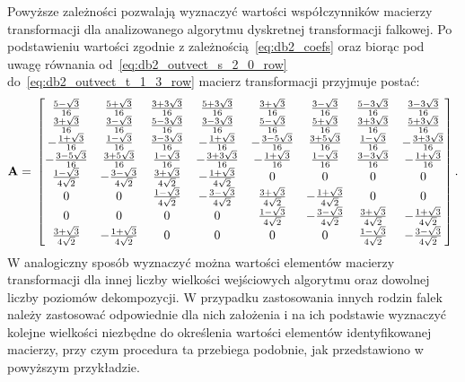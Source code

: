 Powyższe zależności pozwalają wyznaczyć wartości współczynników macierzy transformacji dla analizowanego algorytmu dyskretnej transformacji falkowej. Po podstawieniu wartości zgodnie z zależnością~\eqref{eq:db2_coefs} oraz biorąc pod uwagę równania od~\eqref{eq:db2_outvect_s_2_0_row} do~\eqref{eq:db2_outvect_t_1_3_row} macierz transformacji przyjmuje postać:
\begin{equation}
\mathbf{A} = \\
\begin{bmatrix}
\frac{5 - \sqrt{3}}{16} & \frac{5 + \sqrt{3}}{16} & \frac{3 + 3 \sqrt{3}}{16} & \frac{5 + 3 \sqrt{3}}{16} & \frac{3 + \sqrt{3}}{16} & \frac{3 - \sqrt{3}}{16} & \frac{5 - 3 \sqrt{3}}{16} & \frac{3 - 3 \sqrt{3}}{16} \\
\frac{3 + \sqrt{3}}{16} & \frac{3 - \sqrt{3}}{16} & \frac{5 - 3 \sqrt{3}}{16} & \frac{3 - 3 \sqrt{3}}{16} & \frac{5 - \sqrt{3}}{16} & \frac{5 + \sqrt{3}}{16} & \frac{3 + 3 \sqrt{3}}{16} & \frac{5 + 3 \sqrt{3}}{16} \\
- \frac{1 + \sqrt{3}}{16} & \frac{1 - \sqrt{3}}{16} & \frac{3 - 3 \sqrt{3}}{16} & - \frac{1 + \sqrt{3}}{16} & - \frac{3 - 5 \sqrt{3}}{16} & \frac{3 + 5 \sqrt{3}}{16} & \frac{1 - \sqrt{3}}{16} & - \frac{3 + 3 \sqrt{3}}{16} \\
- \frac{3 - 5 \sqrt{3}}{16} & \frac{3 + 5 \sqrt{3}}{16} & \frac{1 - \sqrt{3}}{16} & - \frac{3 + 3 \sqrt{3}}{16} & - \frac{1 + \sqrt{3}}{16} & \frac{1 - \sqrt{3}}{16} & \frac{3 - 3 \sqrt{3}}{16} & - \frac{1 + \sqrt{3}}{16} \\
\frac{1 - \sqrt{3}}{4 \sqrt{2}} & - \frac{3 - \sqrt{3}}{4 \sqrt{2}} & \frac{3 + \sqrt{3}}{4 \sqrt{2}} & - \frac{1 + \sqrt{3}}{4 \sqrt{2}} & 0 & 0 & 0 & 0 \\
0 & 0 & \frac{1 - \sqrt{3}}{4 \sqrt{2}} & - \frac{3 - \sqrt{3}}{4 \sqrt{2}} & \frac{3 + \sqrt{3}}{4 \sqrt{2}} & - \frac{1 + \sqrt{3}}{4 \sqrt{2}} & 0 & 0 \\
0 & 0 & 0 & 0 & \frac{1 - \sqrt{3}}{4 \sqrt{2}} & - \frac{3 - \sqrt{3}}{4 \sqrt{2}} & \frac{3 + \sqrt{3}}{4 \sqrt{2}} & - \frac{1 + \sqrt{3}}{4 \sqrt{2}} \\
\frac{3 + \sqrt{3}}{4 \sqrt{2}} & - \frac{1 + \sqrt{3}}{4 \sqrt{2}} & 0 & 0 & 0 & 0 & \frac{1 - \sqrt{3}}{4 \sqrt{2}} & - \frac{3 - \sqrt{3}}{4 \sqrt{2}}
\end{bmatrix}
\label{eq:db2_2_8_matrix}.
\end{equation}
W analogiczny sposób wyznaczyć można wartości elementów macierzy transformacji dla innej liczby wielkości wejściowych algorytmu oraz dowolnej liczby poziomów dekompozycji. W przypadku zastosowania innych rodzin falek należy zastosować odpowiednie dla nich założenia i na ich podstawie wyznaczyć kolejne wielkości niezbędne do określenia wartości elementów identyfikowanej macierzy, przy czym procedura ta przebiega podobnie, jak przedstawiono w powyższym przykładzie.

